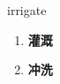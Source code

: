 
\begin{frame}
{\huge irrigate}
\begin{center}
\begin{enumerate}\Large
  \item \textbf{灌溉}
  \item \textbf{冲洗}
\end{enumerate}
\end{center}
\end{frame}
